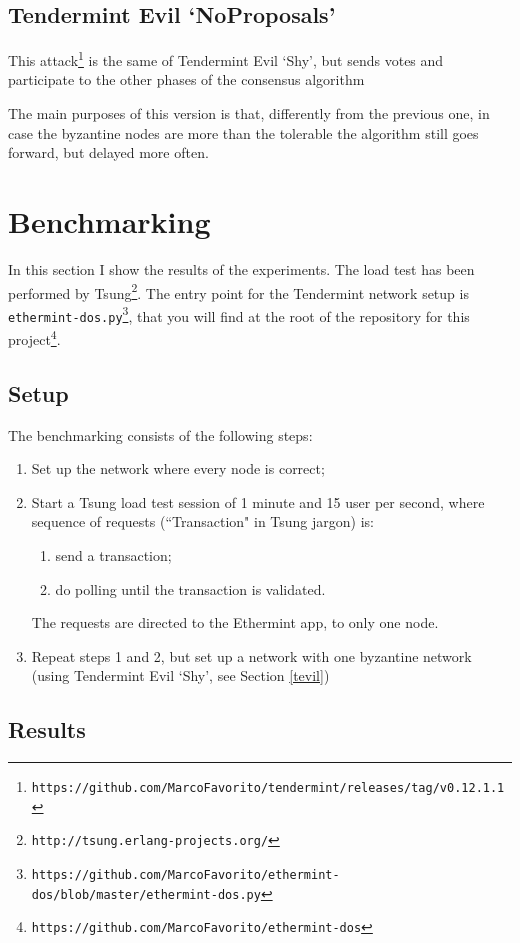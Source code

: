 \documentclass[]{article}
\begin{document}
\subsection{Tendermint Evil `NoProposals'}
This attack\footnote{\texttt{https://github.com/MarcoFavorito/tendermint/releases/tag/v0.12.1.1}} is the same of Tendermint Evil `Shy', but sends votes and participate to the other phases of the consensus algorithm

The main purposes of this version is that, differently from the previous one, in case the byzantine nodes are more than the tolerable the algorithm still goes forward, but delayed more often.

\section{Benchmarking}
\label{bench}
In this section I show the results of the experiments. The load test has been performed by Tsung\footnote{\texttt{http://tsung.erlang-projects.org/}}. The entry point for the Tendermint network setup is \texttt{ethermint-dos.py}\footnote{\texttt{https://github.com/MarcoFavorito/ethermint-dos/blob/master/ethermint-dos.py}}, that you will find at the root of the repository for this project\footnote{\texttt{https://github.com/MarcoFavorito/ethermint-dos}}. \\
\subsection{Setup}
The benchmarking consists of the following steps:
\begin{enumerate}
	\item Set up the network where every node is correct;
	\item Start a Tsung load test session of 1 minute and 15 user per second, where sequence of requests (``Transaction" in Tsung jargon) is:
	\begin{enumerate}
		\item send a transaction;
		\item do polling until the transaction is validated.
	\end{enumerate} 
	The requests are directed to the Ethermint app, to only one node.
	\item Repeat steps 1 and 2, but set up a network with one byzantine network (using Tendermint Evil `Shy', see Section \ref{tevil})
\end{enumerate}

\subsection{Results}
\end{document}
